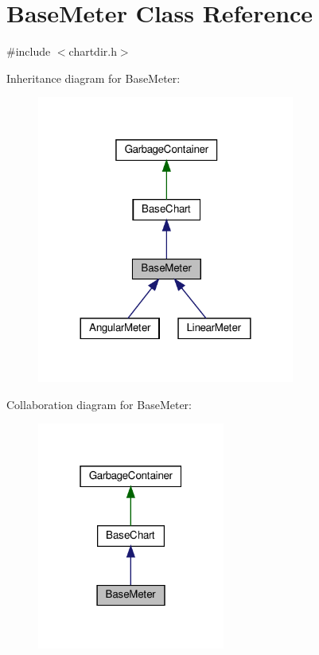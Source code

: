 \hypertarget{class_base_meter}{}\section{Base\+Meter Class Reference}
\label{class_base_meter}


{\ttfamily \#include $<$chartdir.\+h$>$}



Inheritance diagram for Base\+Meter\+:
\nopagebreak
\begin{figure}[H]
\begin{center}
\leavevmode
\includegraphics[width=240pt]{class_base_meter__inherit__graph}
\end{center}
\end{figure}


Collaboration diagram for Base\+Meter\+:
\nopagebreak
\begin{figure}[H]
\begin{center}
\leavevmode
\includegraphics[width=175pt]{class_base_meter__coll__graph}
\end{center}
\end{figure}
